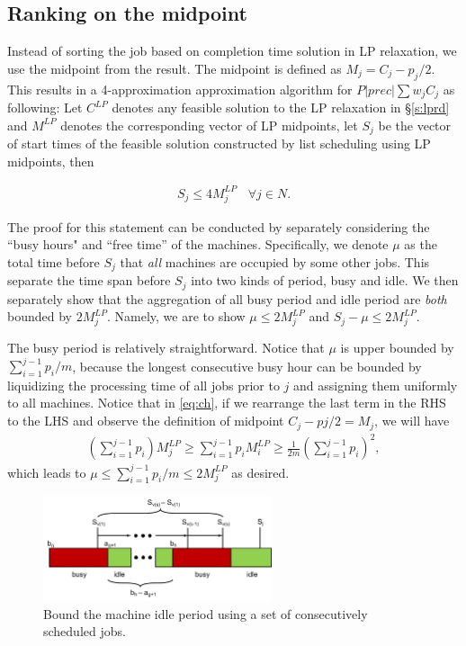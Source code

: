 \subsection{Ranking on the midpoint} \label{s:lpm}
Instead of sorting the job based on completion time solution in LP relaxation, we use the midpoint from the result. The midpoint is defined as $M_j = C_j - p_j/2$. This results in a 4-approximation approximation algorithm for $P|prec|\sum w_jC_j$ as following: Let $C^{LP}$ denotes any feasible solution to the LP relaxation in \S\ref{s:lprd} and $M^{LP}$ denotes the corresponding vector of LP midpoints, let $S_j$ be the vector of start times of the feasible solution constructed by list scheduling using LP midpoints, then

\begin{align}
S_j \leq 4 M^{LP}_j \:\:\:\: \forall j \in N.
\end{align}

The proof for this statement can be conducted by separately considering the ``busy hours" and ``free time'' of the machines. Specifically, we denote $\mu$ as the total time before $S_j$ that \emph{all} machines are occupied by some other jobs. This separate the time span before $S_j$ into two kinds of period, busy and idle. We then separately show that the aggregation of all busy period and idle period are \emph{both} bounded by $2M^{LP}_j$. Namely, we are to show $\mu \leq 2 M^{LP}_j$ and  $S_j - \mu \leq 2 M^{LP}_j$.

The busy period is relatively straightforward. Notice that $\mu$ is upper bounded by $\sum_{i=1}^{j-1} p_i /m$, because the longest consecutive busy hour can be bounded by liquidizing the processing time of all jobs prior to $j$ and assigning them uniformly to all machines. Notice that in \eqref{eq:ch}, if we rearrange the last term in the RHS to the LHS and observe the definition of midpoint $C_j-pj/2 = M_j$, we will have 
\begin{align}
\left(\sum_{i=1}^{j-1}p_i\right)M^{LP}_j \geq \sum_{i=1}^{j-1} p_i M^{LP}_i \geq \frac{1}{2m}\left(\sum_{i=1}^{j-1}p_i\right)^2,
\end{align}
which leads to $\mu \leq \sum_{i=1}^{j-1} p_i /m \leq 2 M^{LP}_j$ as desired. 

\begin{figure}[h]
	\centering
	\includegraphics[width=0.6\textwidth]{figs/4-approx-1.pdf}
	\caption{Bound the machine idle period using a set of consecutively scheduled jobs.}
	\label{fig:4-approx}
\end{figure}

